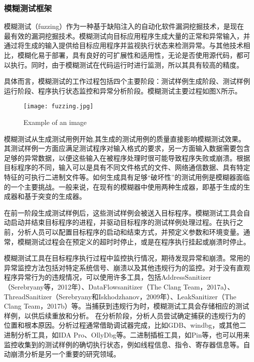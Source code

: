 
\subsubsection{模糊测试框架}
模糊测试（fuzzing）作为一种基于缺陷注入的自动化软件漏洞挖掘技术，是现在最有效的漏洞挖掘技术。模糊测试向目标应用程序生成大量的正常和异常输入，并通过将生成的输入提供给目标应用程序并监视执行状态来检测异常。与其他技术相比，模糊化易于部署，具有良好的可扩展性和适用性，无论是否使用源代码，都可以执行。同时，由于模糊测试在代码运行时进行监测，所以其具有较高的精度。

具体而言，模糊测试的工作过程包括四个主要阶段：测试样例生成阶段、测试样例运行阶段、程序执行状态监控和异常分析阶段。模糊测试主要过程如图X所示。
\begin{figure}[ht]
	\centering
	\texttt{[image: fuzzing.jpg]}
	\caption{Example of an image}
	\label{fig:fuzzing}
\end{figure}

模糊测试从生成测试用例开始,其生成的测试用例的质量直接影响模糊测试效果。其测试样例一方面应满足测试程序对输入格式的要求，另一方面输入数据需要包含足够的异常数据，以便这些输入在被程序处理时很可能导致程序失败或崩溃。根据目标程序的不同，输入可以是具有不同文件格式的文件、网络通信数据、具有特定特征的可执行二进制文件等。如何生成具有足够“破坏性”的测试用例是模糊器面临的一个主要挑战。一般来说，在现有的模糊器中使用两种生成器，即基于生成的生成器和基于突变的生成器。

在前一阶段生成测试样例后，这些测试样例会被送入目标程序。模糊测试工具会自动启动并结束目标程序的进程，并驱动目标程序的测试样例处理过程。在执行之前，分析人员可以配置目标程序的启动和结束方式，并预定义参数和环境变量。通常，模糊测试过程会在预定义的超时时停止，或是在程序执行挂起或崩溃时停止。

模糊测试工具在目标程序执行过程中监控执行情况，期待发现异常和崩溃。常用的异常监控方法包括对特定系统信号、崩溃以及其他违规行为的监控。对于没有直观程序异常行为的违规情况，可以使用许多工具，包括AddressSanitizer（Serebryany等，2012年）、DataFlowsanitizer（The Clang Team，2017a）、ThreadSanitizer（Serebryany和Iskhodzhanov，2009年）、LeakSanitizer（The Clang Team，2017b）等。当捕获到违规行为时，模糊测试工具会存储相应的测试样例，以供后续重放和分析。
在分析阶段，分析人员尝试确定捕获的违规行为的位置和根本原因。分析过程通常借助调试器完成，比如GDB、windbg，或其他二进制分析工具，如IDA Pro、OllyDbg等。二进制插桩工具，如Pin等，也可以用来监控收集到的测试样例的确切执行状态，例如线程信息、指令、寄存器信息等。自动崩溃分析是另一个重要的研究领域。

